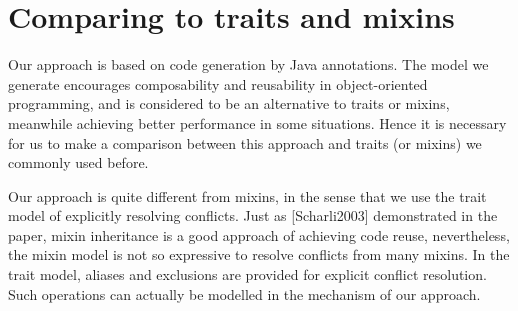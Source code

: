 \section{Comparing to traits and mixins}

\begin{comment}
Haoyuan

   - vs both: we do automatic return type refinement, which has useful applications
   (example: Expression Problem)

   - vs traits: we support of methods to create new objects (a replacement to constructors);
   Moreover we have the with and clone methods (we miss more applications for those). Show
   how to model the operations on traits; discuss operations that we cannot model
   (example: renaming).

   - vs mixins: we use the trait model of explicitly resolving conflicts. This is arguably
   better for reasoning.
\end{comment}

Our approach is based on code generation by Java annotations. The model we generate encourages composability and reusability in object-oriented programming, and is considered to be an alternative to traits or mixins,  meanwhile achieving better performance in some situations. Hence it is necessary for us to make a comparison between this approach and traits (or mixins) we commonly used before.

Our approach is quite different from mixins, in the sense that we use the trait model of explicitly resolving conflicts. Just as [Scharli2003] demonstrated in the paper, mixin inheritance is a good approach of achieving code reuse, nevertheless, the mixin model is not so expressive to resolve conflicts from many mixins. In the trait model, aliases and exclusions are provided for explicit conflict resolution. Such operations can actually be modelled in the mechanism of our approach.

